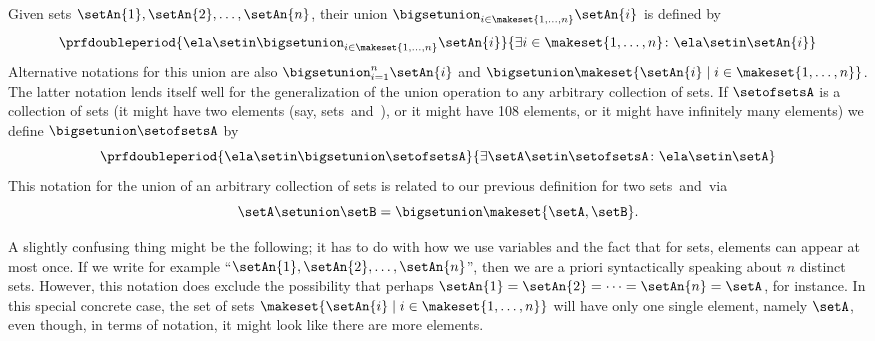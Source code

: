 Given sets $\setAn{1}, \setAn{2}, \dots, \setAn{n}$, their union $\bigsetunion_{i \in \makeset{1,\dots, n}} \setAn{i}$ is defined by
\begin{equation}
    \prfdoubleperiod{ \ela \setin \bigsetunion_{i \in \makeset{1,\dots, n}} \setAn{i} }{\exists i \in \makeset{1,\dots, n} \colon \ela \setin\setAn{i}}
\end{equation}
Alternative notations for this union are also $\bigsetunion_{i = 1}^{n}  \setAn{i}$ and $\bigsetunion \makeset{ \setAn{i} \mid i \in \makeset{1,\dots, n}}$. The latter notation lends itself well for the generalization of the union operation to any arbitrary collection of sets. If $\setofsetsA$ is a collection of sets (it might have two elements (say, sets~\setA and~\setB), or it might have 108 elements, or it might have infinitely many elements) we define $\bigsetunion \setofsetsA$ by
%
\begin{equation}
    \prfdoubleperiod{ \ela \setin\bigsetunion \setofsetsA }{\exists \setA \setin\setofsetsA \colon \ela \setin\setA}
\end{equation}
%
This notation for the union of an arbitrary collection of sets is related to our previous definition for two sets~\setA and~\setB via
\begin{equation}
    \setA \setunion \setB = \bigsetunion \makeset{ \setA, \setB }.
\end{equation}

\begin{remark}
A slightly confusing thing might be the following; it has to do with how we use variables and the fact that for sets, elements can appear at most once. If we write for example ``$\setAn{1}, \setAn{2}, \dots, \setAn{n}$'', then we are a priori syntactically speaking about $n$ distinct sets. However, this notation does exclude the possibility that perhaps $\setAn{1} = \setAn{2} = \dots = \setAn{n} = \setA$, for instance. In this special concrete case, the set of sets $\makeset{ \setAn{i} \mid i \in \makeset{1,\dots, n}}$ will have only one single element, namely $\setA$, even though, in terms of notation, it might look like there are more elements. 
\end{remark}

